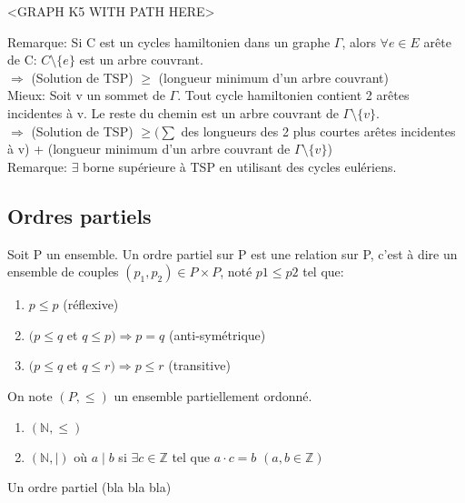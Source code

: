 \begin{exmp}
<GRAPH K5 WITH PATH HERE>\\
\end{exmp}

Remarque: Si C est un cycles hamiltonien dans un graphe $\Gamma$, alors $\forall e \in E$ arête de C: $ C \setminus\{e\}$ est un arbre couvrant.\\

$\Rightarrow$ (Solution de TSP) $\geq$ (longueur minimum d'un arbre couvrant)\\

Mieux: Soit v un sommet de $\Gamma$. Tout cycle hamiltonien contient 2 arêtes incidentes à v. Le reste du chemin est un arbre couvrant de $\Gamma \setminus\{v\}$.\\

$\Rightarrow$ (Solution de TSP) $\geq (\sum$ des longueurs des 2 plus courtes arêtes incidentes à v) + (longueur minimum d'un arbre couvrant de $\Gamma \setminus\{v\}$)\\

Remarque: $\exists$ borne supérieure à TSP en utilisant des cycles eulériens. \\


\subsection{Ordres partiels}

\begin{defn}
Soit P un ensemble. Un ordre partiel sur P est une relation sur P, c'est à dire un ensemble de couples $(p_{1},p_{2}) \in P\times P$, noté $p{1} \leq p{2}$ tel que:
	\begin{enumerate}
		\item $p \leq p$ (réflexive)
		\item $(p \leq q$ et $q \leq p ) \Rightarrow p = q$ (anti-symétrique)
		\item $(p \leq q$ et $q \leq r ) \Rightarrow p \leq r$ (transitive)\\
	\end{enumerate}
On note $(P,\leq)$ un ensemble partiellement ordonné.\\
\end{defn}

\begin{exmp}
	\begin{enumerate}
		\item $(\mathbb{N},\leq)$
		\item $(\mathbb{N},\mid)$ où $a \mid b$ si $\exists c \in \mathbb{Z}$ tel que $a \cdot c = b$ $(a,b \in \mathbb{Z})$\\
	\end{enumerate}
\end{exmp}


Un ordre partiel (bla bla bla) \\



